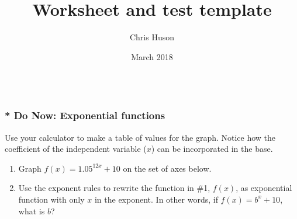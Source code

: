 \documentclass[12pt, oneside]{article}
\title{Worksheet and test template}
\author{Chris Huson}
\date{March 2018}
\begin{document}
\subsubsection*{\\* Do Now: Exponential functions}
Use your calculator to make a table of values for the graph. Notice how the coefficient of the independent variable ($x$) can be incorporated in the base.

\begin{enumerate}

\item Graph $\displaystyle f(x)= 1.05^{12x} +10$ on the set of axes below.
\begin{center}
\end{center} %

\item Use the exponent rules to rewrite the function in \#1, $f(x)$, as exponential function with only $x$ in the exponent. In other words, if $f(x)=b^x+10$, what is $b$? 


\end{enumerate}
\end{document}
